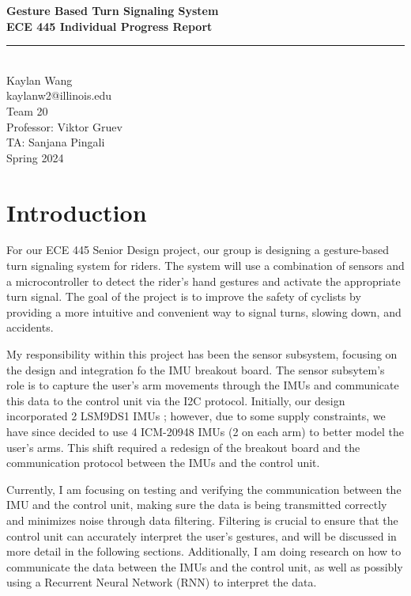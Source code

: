 \documentclass[12pt]{article}
\begin{document}
\begin{titlepage}
\centering
{}
{\LARGE\textbf{Gesture Based Turn Signaling System }}\\[1cm] 
{\large\textbf{ECE 445 Individual Progress Report}}\\[0.3cm]
\rule{\textwidth}{1pt}\\
{\Large Kaylan Wang}\\[1cm] 
{\small kaylanw2@illinois.edu}\\[0cm] 
{\small Team 20}\\[0cm]
{\small Professor: Viktor Gruev}\\[0cm]
{\small TA: Sanjana Pingali}\\[0cm]


{\small Spring 2024}\\[0.5cm]

\end{titlepage} 

\newpage
\tableofcontents 
\newpage
\section{Introduction}
For our ECE 445 Senior Design project, our group is designing a gesture-based turn signaling system for riders. The system will use a combination of sensors and a microcontroller to detect the rider's hand gestures and activate the appropriate turn signal. The goal of the project is to improve the safety of cyclists by providing a more intuitive and convenient way to signal turns, slowing down, and accidents. 

My responsibility within this project has been the sensor subsystem, focusing on the design and integration fo the IMU breakout board. The sensor subsytem's role is to capture the user's arm movements through the IMUs and communicate this data to the control unit via the I2C protocol. Initially, our design incorporated 2 LSM9DS1 IMUs \cite{STMicroelectronics2015LSM9DS1}; however, due to some supply constraints, we have since decided to use 4 ICM-20948 IMUs \cite{ICM20948Datasheet} (2 on each arm) to better model the user's arms. This shift required a redesign of the breakout board and the communication protocol between the IMUs and the control unit. 

Currently, I am focusing on testing and verifying the communication between the IMU and the control unit, making sure the data is being transmitted correctly and minimizes noise through data filtering. Filtering is crucial to ensure that the control unit can accurately interpret the user's gestures, and will be discussed in more detail in the following sections. Additionally, I am doing research on how to communicate the data between the IMUs and the control unit, as well as possibly using a Recurrent Neural Network (RNN) to interpret the data.
\end{document}
